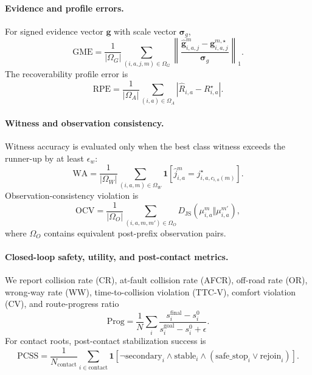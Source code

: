 \documentclass[conference]{IEEEtran}
\begin{document}
\paragraph{Evidence and profile errors.}
For signed evidence vector $\bm g$ with scale vector $\bm\sigma_g$,
\begin{equation}
\label{eq:metric_gme}
    \mathrm{GME}=\frac{1}{|\Omega_G|}\sum_{(i,a,j,m)\in\Omega_G}
    \left\|\frac{\widehat{\bm g}_{i,a,j}^{m}-\bm g_{i,a,j}^{m,\star}}{\bm\sigma_g}\right\|_1.
\end{equation}
The recoverability profile error is
\begin{equation}
\label{eq:metric_rpe}
    \mathrm{RPE}=\frac{1}{|\Omega_A|}\sum_{(i,a)\in\Omega_A}|\hat R_{i,a}-R_{i,a}^{\star}|.
\end{equation}

\paragraph{Witness and observation consistency.}
Witness accuracy is evaluated only when the best class witness exceeds the runner-up by at least $\epsilon_w$:
\begin{equation}
\label{eq:metric_wa}
    \mathrm{WA}=\frac{1}{|\Omega_W|}\sum_{(i,a,m)\in\Omega_W}
    \mathbf 1[\hat j_{i,a}^{m}=j_{i,a,c_{i,a}(m)}^{\star}].
\end{equation}
Observation-consistency violation is
\begin{equation}
\label{eq:metric_ocv}
    \mathrm{OCV}=\frac{1}{|\Omega_O|}\sum_{(i,a,m,m')\in\Omega_O}
    D_{\mathrm{JS}}(\mu_{i,a}^{m}\Vert\mu_{i,a}^{m'}),
\end{equation}
where $\Omega_O$ contains equivalent post-prefix observation pairs.

\paragraph{Closed-loop safety, utility, and post-contact metrics.}
We report collision rate (CR), at-fault collision rate (AFCR), off-road rate (OR), wrong-way rate (WW), time-to-collision violation (TTC-V), comfort violation (CV), and route-progress ratio
\begin{equation}
\label{eq:metric_progress}
    \mathrm{Prog}=\frac{1}{N}\sum_i
    \frac{s_i^{\mathrm{final}}-s_i^0}{s_i^{\mathrm{goal}}-s_i^0+\epsilon}.
\end{equation}
For contact roots, post-contact stabilization success is
\begin{equation}
\label{eq:metric_pcss}
    \mathrm{PCSS}=\frac{1}{N_{\mathrm{contact}}}\sum_{i\in\mathrm{contact}}
    \mathbf 1[\neg\mathrm{secondary}_i\wedge\mathrm{stable}_i\wedge(\mathrm{safe\_stop}_i\vee\mathrm{rejoin}_i)].
\end{equation}
\end{document}
